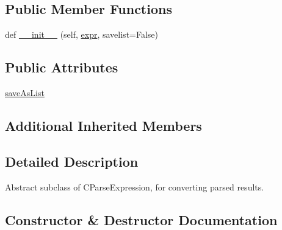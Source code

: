 \subsection*{Public Member Functions}
\begin{DoxyCompactItemize}
\item 
def \hyperlink{classpkg__resources_1_1__vendor_1_1pyparsing_1_1TokenConverter_a4b46a8ef46f5cdc2e6f02d1877c9b7d1}{\+\_\+\+\_\+init\+\_\+\+\_\+} (self, \hyperlink{classpkg__resources_1_1__vendor_1_1pyparsing_1_1ParseElementEnhance_a34e02b3404b2a545ca1be8b522758896}{expr}, savelist=False)
\end{DoxyCompactItemize}
\subsection*{Public Attributes}
\begin{DoxyCompactItemize}
\item 
\hyperlink{classpkg__resources_1_1__vendor_1_1pyparsing_1_1TokenConverter_aed35ce39b8a906800783a8b10c702363}{save\+As\+List}
\end{DoxyCompactItemize}
\subsection*{Additional Inherited Members}


\subsection{Detailed Description}
\begin{DoxyVerb}Abstract subclass of C{ParseExpression}, for converting parsed results.
\end{DoxyVerb}
 

\subsection{Constructor \& Destructor Documentation}
\mbox{\label{classpkg__resources_1_1__vendor_1_1pyparsing_1_1TokenConverter_a4b46a8ef46f5cdc2e6f02d1877c9b7d1}} 
